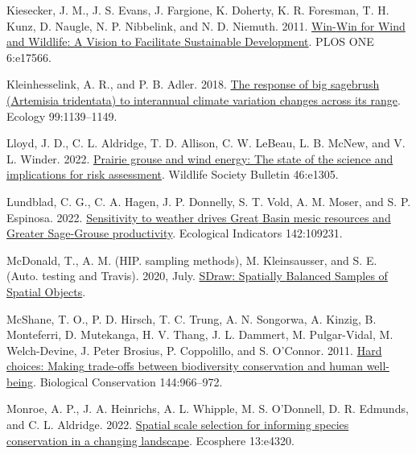\documentclass[
  12pt,
]{article}
\newlength{\cslhangindent}
\newlength{\cslentryspacingunit} %
\newenvironment{CSLReferences}[2] %
 {%
  \setlength{\parindent}{0pt}
  \ifodd #1
  \let\oldpar\par
  \def\par{\hangindent=\cslhangindent\oldpar}
  \fi
  \setlength{\parskip}{#2\cslentryspacingunit}
 }%
 {}
\begin{document}
\begin{CSLReferences}{1}{0}
\leavevmode{}%
Kiesecker, J. M., J. S. Evans, J. Fargione, K. Doherty, K. R. Foresman, T. H. Kunz, D. Naugle, N. P. Nibbelink, and N. D. Niemuth. 2011. \href{https://doi.org/10.1371/journal.pone.0017566}{Win-{Win} for {Wind} and {Wildlife}: {A} {Vision} to {Facilitate} {Sustainable} {Development}}. PLOS ONE 6:e17566.

\leavevmode{}%
Kleinhesselink, A. R., and P. B. Adler. 2018. \href{https://doi.org/10.1002/ecy.2191}{The response of big sagebrush ({Artemisia} tridentata) to interannual climate variation changes across its range}. Ecology 99:1139--1149.

\leavevmode{}%
Lloyd, J. D., C. L. Aldridge, T. D. Allison, C. W. LeBeau, L. B. McNew, and V. L. Winder. 2022. \href{https://doi.org/10.1002/wsb.1305}{Prairie grouse and wind energy: {The} state of the science and implications for risk assessment}. Wildlife Society Bulletin 46:e1305.

\leavevmode{}%
Lundblad, C. G., C. A. Hagen, J. P. Donnelly, S. T. Vold, A. M. Moser, and S. P. Espinosa. 2022. \href{https://doi.org/10.1016/j.ecolind.2022.109231}{Sensitivity to weather drives {Great} {Basin} mesic resources and {Greater} {Sage}-{Grouse} productivity}. Ecological Indicators 142:109231.

\leavevmode{}%
McDonald, T., A. M. (HIP. sampling methods), M. Kleinsausser, and S. E. (Auto. testing and Travis). 2020, July. \href{https://CRAN.R-project.org/package=SDraw}{{SDraw}: {Spatially} {Balanced} {Samples} of {Spatial} {Objects}}.

\leavevmode{}%
McShane, T. O., P. D. Hirsch, T. C. Trung, A. N. Songorwa, A. Kinzig, B. Monteferri, D. Mutekanga, H. V. Thang, J. L. Dammert, M. Pulgar-Vidal, M. Welch-Devine, J. Peter Brosius, P. Coppolillo, and S. O'Connor. 2011. \href{https://doi.org/10.1016/j.biocon.2010.04.038}{Hard choices: {Making} trade-offs between biodiversity conservation and human well-being}. Biological Conservation 144:966--972.

\leavevmode{}%
Monroe, A. P., J. A. Heinrichs, A. L. Whipple, M. S. O'Donnell, D. R. Edmunds, and C. L. Aldridge. 2022. \href{https://doi.org/10.1002/ecs2.4320}{Spatial scale selection for informing species conservation in a changing landscape}. Ecosphere 13:e4320.


\end{CSLReferences}
\end{document}
